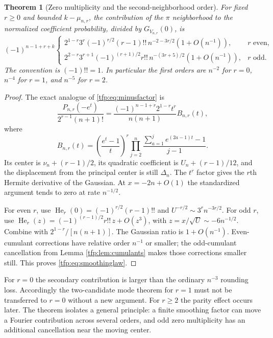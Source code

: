 \documentclass[11pt,a4paper]{article}
\numberwithin{equation}{section}
\newtheorem{theorem}{Theorem}[section]
\theoremstyle{definition}\newtheorem{definition}[theorem]{Definition}
\theoremstyle{remark}\newtheorem{remark}[theorem]{Remark}
\newcommand{\He}{\operatorname{He}}
\begin{document}
\begin{theorem}[Zero multiplicity and the second-neighborhood order]
\label{tfp:thm:smoothing}
For fixed $r\ge0$ and bounded $k-\mu_{n,r}$, the contribution of the
$\pi$ neighborhood to the normalized coefficient probability, divided
by $G_{V_{n,r}}(0)$, is
\begin{equation}\label{tfp:eq:smoothinglaw}
 (-1)^{n-1+r+k}
 \begin{cases}
  \displaystyle 2^{1-r}3^r(-1)^{r/2}(r-1)!!\,
                  n^{-2-3r/2}(1+O(n^{-1})),&r\text{ even},\\[5pt]
  \displaystyle 2^{2-r}3^{r+1}(-1)^{(r+1)/2}r!!\,
                  n^{-(3r+5)/2}(1+O(n^{-1})),&r\text{ odd}.
 \end{cases}
\end{equation}
The convention is $(-1)!!=1$. In particular the first orders are
$n^{-2}$ for $r=0$, $n^{-4}$ for $r=1$, and $n^{-5}$ for $r=2$.
\end{theorem}
\begin{proof}
The exact analogue of \eqref{tfp:eq:minusfactor} is
\begin{equation}
 \frac{P_{n,r}(-e^t)}{2^{r-1}(n+1)!}
 =\frac{(-1)^{n-1+r}2^{1-r}t^r}{n(n+1)}B_{n,r}(t),
\end{equation}
where
\[
 B_{n,r}(t)=\left(\frac{e^t-1}{t}\right)^r
          \prod_{j=2}^n\frac{\sum_{a=1}^j e^{(2a-1)t}-1}{j-1}.
\]
Its center is $\nu_n+(r-1)/2$, its quadratic coefficient is
$U_n+(r-1)/12$, and the displacement from the principal center is still
$\Delta_n$. The $t^r$ factor gives the $r$th Hermite derivative of the
Gaussian. At $x=-2n+O(1)$ the standardized argument tends to zero at
rate $n^{-1/2}$.

For even $r$, use
$\He_r(0)=(-1)^{r/2}(r-1)!!$ and
$U^{-r/2}\sim3^rn^{-3r/2}$. For odd $r$, use
$\He_r(z)=(-1)^{(r-1)/2}r!!\,z+O(z^3)$, with
$z=x/\sqrt U\sim-6n^{-1/2}$. Combine with
$2^{1-r}/[n(n+1)]$. The Gaussian ratio is $1+O(n^{-1})$.
Even-cumulant corrections have relative order $n^{-1}$ or smaller;
the odd-cumulant cancellation from Lemma \ref{tfp:lem:cumulants} makes
those corrections smaller still. This proves \eqref{tfp:eq:smoothinglaw}.
\end{proof}

For $r=0$ the secondary contribution is larger than the ordinary
$n^{-3}$ rounding loss. Accordingly the two-candidate mode theorem for
$r=1$ must not be transferred to $r=0$ without a new argument. For
$r\ge2$ the parity effect occurs later. The theorem isolates a general
principle: a finite smoothing factor can move a Fourier contribution
across several orders, and odd zero multiplicity has an additional
cancellation near the moving center.
\end{document}
